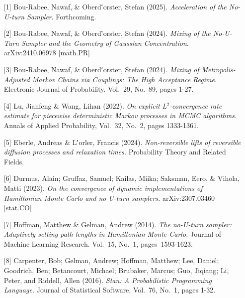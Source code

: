 \begin{talk}
\begin{enumerate}
	\item[{[1]}] Bou-Rabee, Nawaf, \& Oberd\''{o}rster, Stefan (2025). {\it Acceleration of the No-U-turn Sampler}. Forthcoming.
	\item[{[2]}] Bou-Rabee, Nawaf, \& Oberd\''{o}rster, Stefan (2024). {\it Mixing of the No-U-Turn Sampler and the Geometry of Gaussian Concentration}. arXiv:2410.06978 [math.PR]
	\item[{[3]}] Bou-Rabee, Nawaf, \& Oberd\''{o}rster, Stefan (2024). {\it Mixing of Metropolis-Adjusted Markov Chains via Couplings: The High Acceptance Regime}. Electronic Journal of Probability. Vol.~29,  No.~89, pages 1-27.  
	\item[{[4]}]  Lu, Jianfeng \& Wang, Lihan (2022). {\it On explicit L$^2$-convergence rate estimate for piecewise deterministic Markov processes in MCMC algorithms.} Annals of Applied Probability, Vol.~32, No.~2, pages 1333-1361.
	\item[{[5]}] Eberle, Andreas \& L\''{o}rler, Francis (2024). {\it Non-reversible lifts of reversible diffusion processes and relaxation times.} Probability Theory and Related Fields.
	\item[{[6]}] Durmus, Alain;  Gruffaz, Samuel;  Kailas, Miika;  Saksman, Eero, \&  Vihola, Matti (2023). {\it On the convergence of
dynamic implementations of Hamiltonian Monte Carlo and no U-turn samplers.} arXiv:2307.03460  [stat.CO] 
\item[{[7]}]  Hoffman, Matthew  \& Gelman, Andrew  (2014). {\it The no-U-turn sampler: Adaptively setting path lengths in
Hamiltonian Monte Carlo.} Journal of Machine Learning Research. Vol.~15, No.~1, pages~1593-1623.
\item[{[8]}]   Carpenter, Bob; Gelman, Andrew;  Hoffman, Matthew; Lee, Daniel;  Goodrich, Ben; Betancourt, Michael; Brubaker, Marcus;
Guo, Jiqiang; Li, Peter, and  Riddell, Allen  (2016). {\em Stan: A Probabilistic Programming Language.} Journal of
Statistical Software, Vol.~76, No.~1, pages 1-32.
\end{enumerate}
\end{talk}

